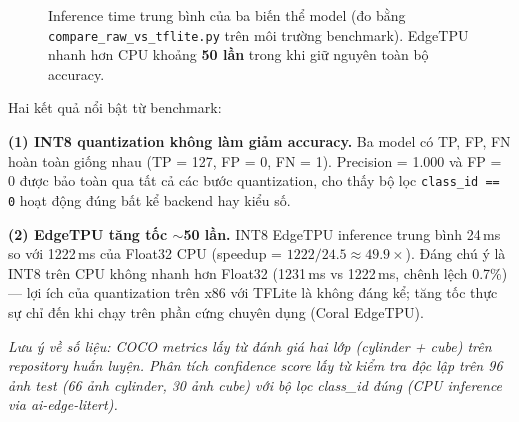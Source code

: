 \begin{figure}[htbp]
  \centering
  \caption{Inference time trung bình của ba biến thể model (đo bằng
           \texttt{compare\_raw\_vs\_tflite.py} trên môi trường
           benchmark). EdgeTPU nhanh hơn CPU khoảng \textbf{50 lần}
           trong khi giữ nguyên toàn bộ accuracy.}
  \label{fig:ai3-latency}
\end{figure}

Hai kết quả nổi bật từ benchmark:

\textbf{(1) INT8 quantization không làm giảm accuracy.}
Ba model có TP, FP, FN hoàn toàn giống nhau (TP = 127, FP = 0,
FN = 1). Precision = 1.000 và FP = 0 được bảo toàn qua tất cả
các bước quantization, cho thấy bộ lọc \texttt{class\_id == 0}
hoạt động đúng bất kể backend hay kiểu số.

\textbf{(2) EdgeTPU tăng tốc $\sim$50 lần.}
INT8 EdgeTPU inference trung bình 24\,ms so với 1222\,ms của
Float32 CPU (speedup = $1222/24.5 \approx 49.9\times$).
Đáng chú ý là INT8 trên CPU không nhanh hơn Float32 (1231\,ms
vs 1222\,ms, chênh lệch 0.7\%) --- lợi ích của quantization trên
x86 với TFLite là không đáng kể; tăng tốc thực sự chỉ đến khi
chạy trên phần cứng chuyên dụng (Coral EdgeTPU).

\smallskip
\noindent\textit{\small
Lưu ý về số liệu: COCO metrics lấy từ đánh giá hai lớp
(cylinder + cube) trên repository huấn luyện. Phân tích
confidence score lấy từ kiểm tra độc lập trên 96 ảnh test
(66 ảnh cylinder, 30 ảnh cube) với bộ lọc class\_id đúng
(CPU inference via ai-edge-litert).}



